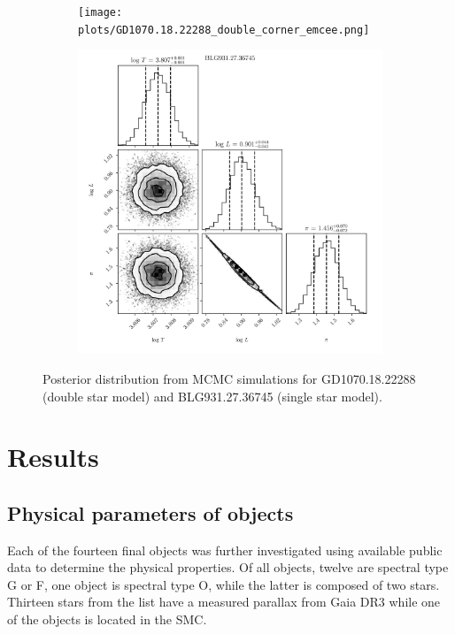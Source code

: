 \documentclass{pracalicmgr}
\begin{document}
\begin{figure}
    \begin{subfigure}{1\textwidth}
        \centering
       \texttt{[image: plots/GD1070.18.22288\_double\_corner\_emcee.png]}
       \label{fig:Ng1} 
    \end{subfigure}
    
    \begin{subfigure}{1\textwidth}
        \centering
       \includegraphics[scale=0.5]{plots/BLG931.27.36745_simple_corner_emcee.png}
    \end{subfigure}
    \caption{Posterior distribution from MCMC simulations for GD1070.18.22288 (double star model)
    and BLG931.27.36745 (single star model).}\label{corner_1}
\end{figure}
\chapter{Results}
\section{Physical parameters of objects}
Each of the fourteen final objects was further investigated using available public data to determine the physical properties.
Of all objects, twelve are spectral type G or F, one object is spectral type O, while the latter is composed of two stars.
Thirteen stars from the list have a measured parallax from Gaia DR3 while one of the objects is located in the SMC.
\end{document}
